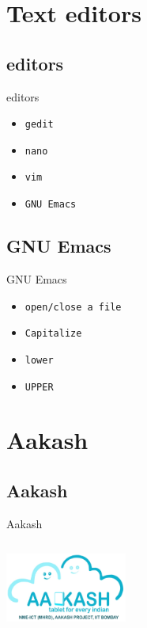\documentclass{beamer}
\begin{document}
\section{Text editors}
\subsection{editors}
\begin{frame}{editors}
  \begin{block}{}
    \begin{itemize}
    \item {\tt gedit}
      \pause
    \item {\tt nano}
      \pause
    \item {\tt vim}
      \pause
    \item {\tt GNU Emacs}
    \end{itemize}
  \end{block}
\end{frame}
\subsection{GNU Emacs}
\begin{frame}{GNU Emacs}
  \begin{block}{}
    \begin{itemize}
    \item {\tt open/close a file}
      \pause
    \item {\tt Capitalize}
      \pause
    \item {\tt lower}
      \pause
    \item {\tt UPPER}
    \end{itemize}
  \end{block}
\end{frame}

\section{Aakash}
\subsection{Aakash}
\begin{frame}{Aakash}
  \begin{center}
      {\includegraphics[width=4cm,height=3cm]{aakash-logo.png}}
  \end{center}
\end{frame}
\end{document}
